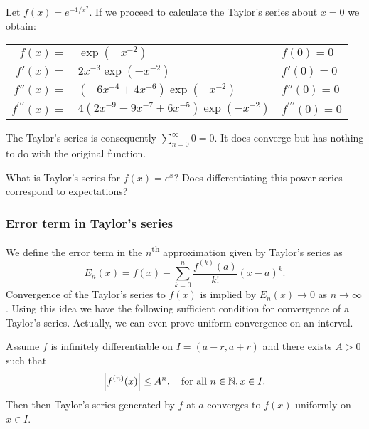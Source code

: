 \begin{example*}
  Let  \(f(x) = e^{-1/x^2}\).
  If we proceed to calculate the Taylor's series about \(x=0\) we obtain:

  \begin{tabular}{ r l  l}
    \(f(x) = \)
     & \hspace{-0.7em}\( \exp(-x^{-2})\)
     & \(f(0)=0\)                                                         \\
    \(f'(x)=\)
     & \hspace{-0.7em}\( 2x^{-3} \exp(-x^{-2})\)
     & \(f'(0)=0\)                                                        \\
    \(f''(x)=\)
     & \hspace{-0.7em}\( (-6 x^{-4}   + 4x^{-6} )\exp(-x^{-2})  \)
     & \(f''(0)=0\)                                                       \\
    \(f^{\prime\prime\prime}(x)=\)
     & \hspace{-0.7em}\( 4 (2x^{-9} - 9 x^{-7} + 6 x^{-5})\exp(-x^{-2})\)
     & \(f^{\prime\prime\prime}(0)=0\)
  \end{tabular}

  \noindent
  The Taylor's series is consequently \(\sum_{n=0}^{\infty} 0 = 0\).
  It does converge but has nothing to do with the original function.
\end{example*}

\begin{example*}
  What is Taylor's series for \(f(x) = e^{x}\)?
  Does differentiating this power series correspond to expectations?
\end{example*}



\subsubsection*{Error term in Taylor's series}

We define the error term in the \(n\)\textsuperscript{th} approximation given by Taylor's series as
\[
  E_n(x) = f(x) - \sum_{k=0}^{n} \frac{f^{(k)}(a)}{k!}{(x-a)}^k.
\]
Convergence of the Taylor's series to \(f(x)\) is implied by \(E_n(x) \to 0\) as \(n\to \infty\).
Using this idea we have the following sufficient condition for convergence of a Taylor's series.
Actually, we can even prove uniform convergence on an interval.

\begin{theorem}
  Assume \(f\) is infinitely differentiable on \(I=(a-r,a+r)\) and there exists \(A>0\) such that
  \[
    \left|f^{(n)}(x)\right|\leq A^n, \quad \text{for all \(n\in \mathbb{N}, x\in I\)}.
  \]
  Then then Taylor's series generated by \(f\) at \(a\) converges to \(f(x)\) uniformly on \(x\in I\).
\end{theorem}

